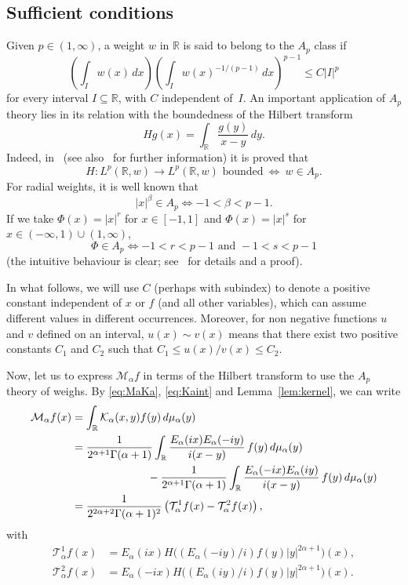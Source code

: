\documentclass[a4paper]{amsart}
\theoremstyle{plain}
\theoremstyle{remark}
\newcommand{\R}{\mathbb{R}}
\newcommand{\Ma}{\mathcal{M}_\alpha} %
\newcommand{\Ka}{\mathcal{K}_\alpha} %
\newcommand{\Ta}{\mathcal{T}_\alpha} %
\newcommand{\mua}{\mu_\alpha}
\begin{document}
\subsection{Sufficient conditions}

Given $p \in (1,\infty)$, a weight $w$ in $\R$ is said to belong to the $A_p$ class if
$$
   \left(\int_I w(x)\,dx \right) \left(\int_I w(x)^{-1/(p-1)}\,dx \right)^{p-1}
   \le C|I|^p
$$
for every interval $I \subseteq \R$, with $C$ independent of~$I$. An
important application of $A_p$ theory lies in its relation with the boundedness
of the Hilbert transform
$$
   Hg(x) = \int_{\R} \frac{g(y)}{x-y}\,dy.
$$
Indeed, in~\cite{HMW} (see also~\cite{GcRf} for further information) it is proved that
$$
  H \colon L^p(\R,w) \to L^p(\R,w) \textrm{ bounded}
  \ \iff \ w \in A_p.
$$
For radial weights, it is well known that
$$
   |x|^\beta \in A_p \iff -1< \beta < p-1.
$$
If we take $\Phi(x) = |x|^r$ for $x \in [-1,1]$ and $\Phi(x) = |x|^s$ for $x
\in (-\infty,1) \cup (1,\infty)$,
\begin{equation}
\label{eq:PhiAp}
   \Phi \in A_p \iff -1 < r < p-1 \text{ and } -1 < s < p-1
\end{equation}
(the intuitive behaviour is clear; see~\cite{Per} for details and a proof).

In what follows, we will use $C$ (perhaps with subindex) to denote a positive constant independent of $x$ or $f$ (and all other variables), which can assume different values in different occurrences. Moreover, for non negative functions $u$ and $v$ defined on an interval, $u(x) \sim v(x)$ means that there exist two positive constants $C_1$ and $C_2$ such that $C_1 \le u(x)/v(x) \le C_2$. 

Now, let us to express $\Ma f$ in terms of the Hilbert transform to use the $A_p$ theory of weighs. 
By \eqref{eq:MaKa}, \eqref{eq:Kaint} and Lemma~\ref{lem:kernel}, we can write
\begin{align*}
  \Ma f(x) &= \int_{\R} \Ka(x,y) f(y) \,d\mua(y) \\
  &= \frac{1}{2^{\alpha+1}\Gamma(\alpha+1)}
    \int_{\R} \frac{E_{\alpha}(ix)E_{\alpha}(-iy)}{i(x-y)}\, f(y) \,d\mua(y) \\
  &\hspace{0.2\textwidth}\null- \frac{1}{2^{\alpha+1}\Gamma(\alpha+1)}
    \int_{\R} \frac{E_{\alpha}(-ix)E_{\alpha}(iy)}{i(x-y)}\, f(y) \,d\mua(y) \\
  &= \frac{1}{2^{2\alpha+2}\Gamma(\alpha+1)^2} \left(\Ta^1 f(x) - \Ta^2 f(x)\right),
\end{align*}
with
\begin{align*}
  \Ta^1 f(x)
  &= E_{\alpha}(ix) H\big( (E_{\alpha}(-iy)/i) f(y) |y|^{2\alpha+1}\big)(x), \\
  \Ta^2 f(x)
  &= E_{\alpha}(-ix) H\big( (E_{\alpha}(iy)/i) f(y) |y|^{2\alpha+1}\big)(x).
\end{align*}
\end{document}
